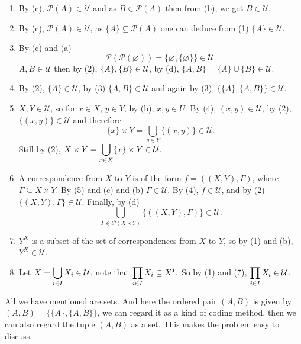\begin{proofenv}
\quad
\begin{enumerate}[label=(\arabic*)]
    \item By (c), $\mathcal{P}(A)\in \mathcal{U}$ and as $B\in \mathcal{P}(A)$ then from (b), we get $B\in \mathcal{U}$.
    \item By (c), $\mathcal{P}(A)\in \mathcal{U}$, as $\{A\}\subseteq \mathcal{P}(A)$ one can deduce from (1) $\{A\}\in \mathcal{U}$.
    \item By (c) and (a) $$\mathcal{P}(\mathcal{P}(\varnothing))=\{\varnothing,\{\varnothing\}\}\in \mathcal{U}.$$ $A,B\in \mathcal{U}$ then by (2), $\{A\},\{B\}\in \mathcal{U}$, by (d), $\{A,B\}=\{A\}\cup\{B\}\in \mathcal{U}.$
    \item By (2), $\{A\}\in \mathcal{U}$, by (3) $\{A,B\}\in \mathcal{U}$ and again by (3), $\{\{A\},\{A,B\}\}\in \mathcal{U}$.
    \item $X,Y\in\mathcal{U}$, so for $x\in X$, $y\in Y$, by (b), $x,y\in U$. By (4), $(x,y)\in \mathcal{U}$, by (2), $\{(x,y)\}\in \mathcal{U}$ and therefore $$\{x\}\times Y = \bigcup_{y\in Y} \{(x,y)\}\in \mathcal{U}.$$ Still by (2), $\displaystyle X\times Y = \bigcup_{x\in X}\{x\}\times Y\in \mathcal{U}$.
    \item A correspondence from $X$ to $Y$ is of the form $f = ((X,Y), \Gamma)$, where $\Gamma \subseteq X\times Y$. By (5) and (c) and (b) $\Gamma \in \mathcal{U}$. By (4), $f \in \mathcal{U}$, and by (2) $\{(X,Y),\Gamma\}\in \mathcal{U}.$ Finally, by (d) $$\bigcup_{\Gamma \in \mathcal{P}(X\times Y)}\{((X,Y),\Gamma)\} \in \mathcal{U}.$$
    \item $Y^X$ is a subset of the set of correspondences from $X$ to $Y$, so by (1) and (b), $Y^X\in \mathcal{U}$.
    \item Let $\displaystyle X=\bigcup_{i\in I}X_i \in \mathcal{U}$, note that $\displaystyle \prod_{i\in I}X_i \subseteq X^I.$ So by (1) and (7), $\displaystyle \prod_{i\in I}X_i \in \mathcal{U}$.
\end{enumerate}
\end{proofenv}
\begin{remark}
    All we have mentioned are sets. And here the ordered pair $(A,B)$ is given by $(A,B)=\{\{A\},\{A,B\}\}$, we can regard it as a kind of coding method, then we can also regard the tuple $(A,B)$ as a set. This makes the problem easy to discuss.
\end{remark}

